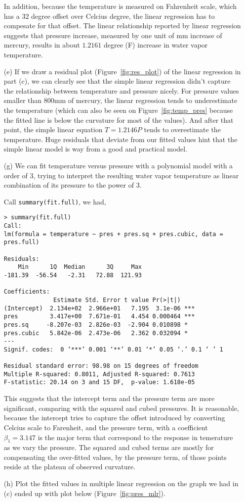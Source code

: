 \documentclass[letter]{article}
\begin{document}
\begin{enumerate}
    In addition, because the temperature is measured on Fahrenheit scale, which
    has a $32$ degree offset over Celcius degree, the linear regression has to
    compesate for that offset. The linear relationship reported by linear
    regression suggests that pressure increase, measured by one unit of mm
    increase of mercury, results in about $1.2161$ degree (F) increase in water
    vapor temperature. 
    \item[(e)]
    If we draw a residual plot (Figure~\ref{fig:res_plot}) of the linear regression in part (c), we can
    clearly see that the simple linear regression didn't capture the
    relationship between temperature and pressure nicely. For pressure values
    smaller than 800mm of mercury, the linear regression tends to underestimate
    the temperature (which can also be seen on Figure~\ref{fig:temp_pres}
    because the fitted line is below the curvature for most of the values). And
    after that point, the simple linear equation $T = 1.2146 P$ tends to
    overestimate the temperature. Huge residuals that deviate from our fitted
    values hint that the simple linear model is way from a good and practical
    model.
    \item[(g)]
    We can fit temperature versus pressure with a polynomial model with a order
    of 3, trying to interpret the resulting water vapor temperature as linear
    combination of its pressure to the power of 3.
    
    Call \verb=summary(fit.full)=, we had,
    \begin{verbatim}
> summary(fit.full)
Call:
lm(formula = temperature ~ pres + pres.sq + pres.cubic, data = pres.full)

Residuals:
    Min      1Q  Median      3Q     Max 
-181.39  -56.54   -2.31   72.88  121.93 

Coefficients:
              Estimate Std. Error t value Pr(>|t|)    
(Intercept)  2.134e+02  2.966e+01   7.195  3.1e-06 ***
pres         3.417e+00  7.671e-01   4.454 0.000464 ***
pres.sq     -8.207e-03  2.826e-03  -2.904 0.010898 *  
pres.cubic   5.842e-06  2.473e-06   2.362 0.032094 *  
---
Signif. codes:  0 ‘***’ 0.001 ‘**’ 0.01 ‘*’ 0.05 ‘.’ 0.1 ‘ ’ 1 

Residual standard error: 98.98 on 15 degrees of freedom
Multiple R-squared: 0.8011, Adjusted R-squared: 0.7613 
F-statistic: 20.14 on 3 and 15 DF,  p-value: 1.618e-05 
    \end{verbatim}
    This suggests that the intercept term and the pressure term are more
    significant, comparing with the squared and cubed pressures. It is
    reasonable, because the intercept tries to capture the offset introduced by
    converting Celcius scale to Farenheit, and the pressure term, with a
    coefficient $\beta_1 = 3.147$ is the major term that correspond to the
    response in temerature as we vary the pressure. The squared and cubed terms
    are mostly for compensating the over-fitted values, by the pressure term, of those points reside at the plateau of observed curvature.
    \item[(h)]
    Plot the fitted values in multiple linear regression on the graph we had in
    (c) ended up with plot below (Figure~\ref{fig:pres_mlr}).
    

\end{enumerate}
\end{document}
